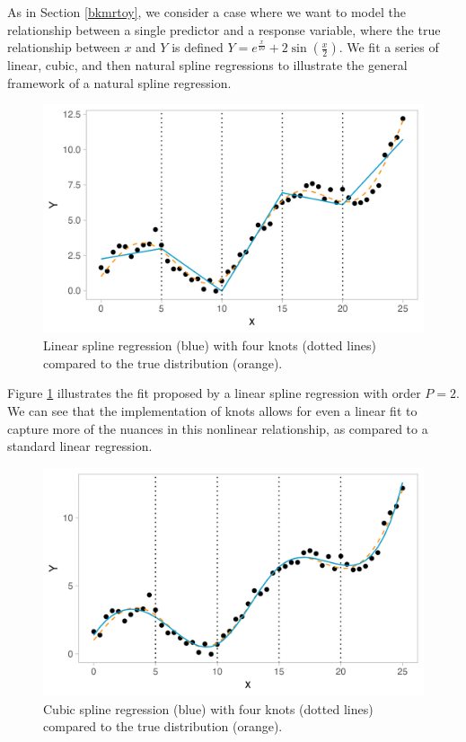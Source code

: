 \documentclass[12pt, twoside]{amherstthesis}
\begin{document}
As in Section \ref{bkmrtoy}, we consider a case where we want to model the relationship between a single predictor and a response variable, where the true relationship between \(x\) and \(Y\) is defined \(Y = e^{\frac{x}{10}} + 2\sin(\frac{x}{2})\). We fit a series of linear, cubic, and then natural spline regressions to illustrate the general framework of a natural spline regression.
\begin{figure}

{\centering \includegraphics[width=0.75\linewidth]{figures/ch3_toy4} 

}

\caption{Linear spline regression (blue) with four knots (dotted lines) compared to the true distribution (orange).}\label{fig:toy4}
\end{figure}
Figure \ref{fig:toy4} illustrates the fit proposed by a linear spline regression with order \(P=2\). We can see that the implementation of knots allows for even a linear fit to capture more of the nuances in this nonlinear relationship, as compared to a standard linear regression.
\begin{figure}

{\centering \includegraphics[width=0.75\linewidth]{figures/ch3_toy5} 

}

\caption{Cubic spline regression (blue) with four knots (dotted lines) compared to the true distribution (orange).}\label{fig:toy5}
\end{figure}
\end{document}
